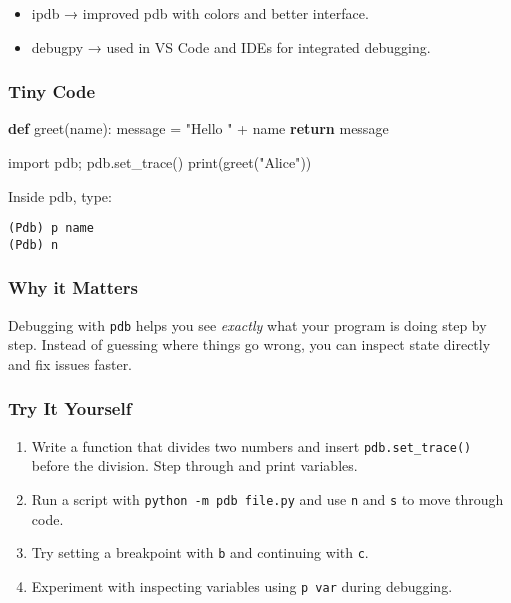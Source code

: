 \documentclass[
  letterpaper,
  DIV=11,
  numbers=noendperiod]{scrreprt}
\newenvironment{Shaded}{\begin{snugshade}}{\end{snugshade}}
\newcommand{\BuiltInTok}[1]{\textcolor[rgb]{0.00,0.23,0.31}{#1}}
\newcommand{\ControlFlowTok}[1]{\textcolor[rgb]{0.00,0.23,0.31}{\textbf{#1}}}
\newcommand{\ImportTok}[1]{\textcolor[rgb]{0.00,0.46,0.62}{#1}}
\newcommand{\KeywordTok}[1]{\textcolor[rgb]{0.00,0.23,0.31}{\textbf{#1}}}
\newcommand{\NormalTok}[1]{\textcolor[rgb]{0.00,0.23,0.31}{#1}}
\newcommand{\OperatorTok}[1]{\textcolor[rgb]{0.37,0.37,0.37}{#1}}
\newcommand{\StringTok}[1]{\textcolor[rgb]{0.13,0.47,0.30}{#1}}
\providecommand{\tightlist}{%
  \setlength{\itemsep}{0pt}\setlength{\parskip}{0pt}}
\begin{document}
\begin{itemize}
\tightlist
\item
  ipdb → improved pdb with colors and better interface.
\item
  debugpy → used in VS Code and IDEs for integrated debugging.
\end{itemize}

\subsubsection{Tiny Code}\label{tiny-code-91}

\begin{Shaded}
\begin{Highlighting}[]
\KeywordTok{def}\NormalTok{ greet(name):}
\NormalTok{    message }\OperatorTok{=} \StringTok{"Hello "} \OperatorTok{+}\NormalTok{ name}
    \ControlFlowTok{return}\NormalTok{ message}

\ImportTok{import}\NormalTok{ pdb}\OperatorTok{;}\NormalTok{ pdb.set\_trace()}
\BuiltInTok{print}\NormalTok{(greet(}\StringTok{"Alice"}\NormalTok{))}
\end{Highlighting}
\end{Shaded}

Inside pdb, type:

\begin{verbatim}
(Pdb) p name
(Pdb) n
\end{verbatim}

\subsubsection{Why it Matters}\label{why-it-matters-91}

Debugging with \texttt{pdb} helps you see \emph{exactly} what your
program is doing step by step. Instead of guessing where things go
wrong, you can inspect state directly and fix issues faster.

\subsubsection{Try It Yourself}\label{try-it-yourself-91}

\begin{enumerate}
\def\labelenumi{\arabic{enumi}.}
\tightlist
\item
  Write a function that divides two numbers and insert
  \texttt{pdb.set\_trace()} before the division. Step through and print
  variables.
\item
  Run a script with \texttt{python\ -m\ pdb\ file.py} and use \texttt{n}
  and \texttt{s} to move through code.
\item
  Try setting a breakpoint with \texttt{b} and continuing with
  \texttt{c}.
\item
  Experiment with inspecting variables using \texttt{p\ var} during
  debugging.
\end{enumerate}
\end{document}
